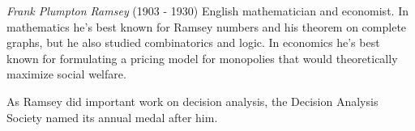 \documentclass[12pt]{article}
\begin{document}
\emph{Frank Plumpton Ramsey} (1903 - 1930) English mathematician and economist. In mathematics he's best known for Ramsey numbers and his theorem on complete graphs, but he also studied combinatorics and logic. In economics he's best known for formulating a pricing model for monopolies that would theoretically maximize social welfare.

As Ramsey did important work on decision analysis, the Decision Analysis Society named its annual medal after him.
\end{document}
